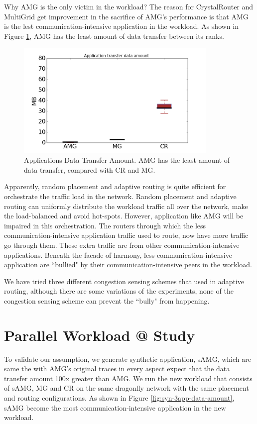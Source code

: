 \documentclass[conference,compsoc]{IEEEtran}
\makeatletter
\newcommand{\Rmnum}[1]{\expandafter\@slowromancap\romannumeral #1@}
\makeatother
\begin{document}
Why AMG is the only victim in the workload? The reason for CrystalRouter and MultiGrid get improvement in the sacrifice of AMG's performance is that AMG is the lest communication-intensive application in the workload. As shown in Figure \ref{fig:3app-data-amount}, AMG has the least amount of data transfer between its ranks. 

\begin{figure}[t!]
  \centering
  \includegraphics[height=2.2in]{data_amount}
  \caption{Applications Data Transfer Amount. AMG has the least amount of data transfer, compared with CR and MG.}
  \label{fig:3app-data-amount}
\end{figure}

Apparently, random placement and adaptive routing is quite efficient for orchestrate the traffic load in the network. Random placement and adaptive routing can uniformly distribute the workload traffic all over the network, make the load-balanced and avoid hot-spots. However, application like AMG will be impaired in this orchestration. The routers through which the less communication-intensive application traffic used to route, now have more traffic go through them. These extra traffic are from other communication-intensive applications. Beneath the facade of harmony, less communication-intensive application are ``bullied" by their communication-intensive peers in the workload. 

We have tried three different congestion sensing schemes that used in adaptive routing\cite{dally-dragonfly}, although there are some variations of the experiments, none of the congestion sensing scheme can prevent the ``bully" from happening. 

\section{Parallel Workload \Rmnum{2 } Study}

To validate our assumption, we generate synthetic application, sAMG, which are same the with AMG's original traces in every aspect expect that the data transfer amount 100x greater than AMG. We run the new workload that consists of sAMG, MG and CR on the same dragonfly network with the same placement and routing configurations. As shown in Figure \ref{fig:syn-3app-data-amount}, sAMG become the most communication-intensive application in the new workload. 
\end{document}
